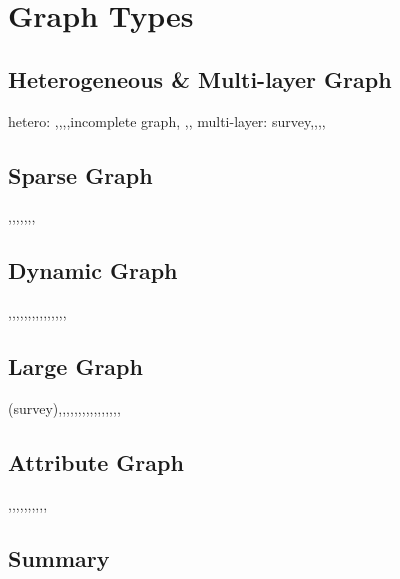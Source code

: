 \section{Graph Types}
\subsection{Heterogeneous \& Multi-layer Graph}
hetero: \cite{huang2018overlapping},\cite{sun2013pathselclus},\cite{gupta2013community},\cite{he2015stochastic},\cite{sun2012relation}incomplete graph,
\cite{radicchi2013detectability},\cite{zhou2013social},
multi-layer: \cite{kim2015community} survey,\cite{bazzi2016community},\cite{de2015identifying},\cite{valles2016multilayer},\cite{huang2018harmonic}

\subsection{Sparse Graph}
\cite{krzakala2013spectral},\cite{chen2012clustering},\cite{amini2013pseudo},\cite{banks2016information},\cite{chin2015stochastic},\cite{guedon2016community},\cite{mirshahvalad2012significant},

\subsection{Dynamic Graph}
\cite{peixoto2017modelling},\cite{kim2013nonparametric},\cite{delvenne2010stability},\cite{ghasemian2016detectability},\cite{xu2015stochastic},\cite{sarzynska2016null},\cite{gauvin2014detecting},\cite{xu2014dynamic},\cite{huang2014querying},\cite{tang2011identifying},\cite{hartmann2016clustering},\cite{chen2013detecting},\cite{wang2013neiwalk},\cite{wang2013dynamic},\cite{folino2013evolutionary},

\subsection{Large Graph}
\cite{harenberg2014community}(survey),\cite{li2015uncovering},\cite{jeub2015think},\cite{de2014mixing},\cite{macropol2010scalable},\cite{kollios2013clustering},\cite{wang2011detecting},\cite{hallac2015network},\cite{bhatia2018dfuzzy},\cite{peixoto2015model},\cite{tsourakakis2017scalable},\cite{li2013efficient},\cite{prat2014high},\cite{whang2012scalable},\cite{satuluri2011local},\cite{spielman2013local},\cite{liu2013large}

\subsection{Attribute Graph}
\cite{zhang2019attributed},\cite{jin2019graph},\cite{yang2013community},\cite{he2017joint},\cite{wang2016semantic},\cite{qi2012community},\cite{huang2015dense},\cite{han2015probabilistic},\cite{xu2012model},\cite{pool2014description},\cite{zhou2010clustering}

\subsection{Summary}